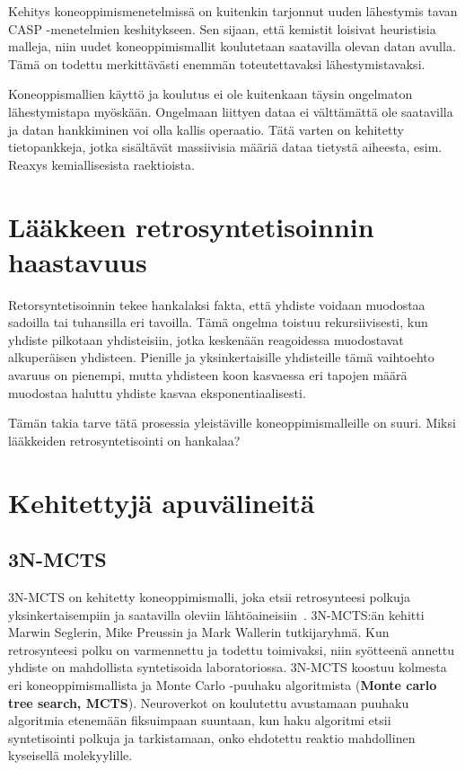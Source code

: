 \documentclass[finnish,twoside,censored,subject,sw-line]{HYthesisML}
\begin{document}
Kehitys koneoppimismenetelmissä on kuitenkin tarjonnut uuden lähestymis tavan CASP -menetelmien keshitykseen. Sen sijaan, että
kemistit loisivat heuristisia malleja, niin uudet koneoppimismallit koulutetaan saatavilla olevan datan avulla.
Tämä on todettu merkittävästi enemmän toteutettavaksi lähestymistavaksi.

Koneoppismallien käyttö ja koulutus ei ole kuitenkaan täysin ongelmaton lähestymistapa myöskään.
Ongelmaan liittyen dataa ei välttämättä ole saatavilla ja datan hankkiminen voi olla kallis operaatio.
Tätä varten on kehitetty tietopankkeja, jotka sisältävät massiivisia määriä dataa tietystä aiheesta, esim. Reaxys kemiallisesista raektioista.


\section{Lääkkeen retrosyntetisoinnin haastavuus}

Retorsyntetisoinnin tekee hankalaksi fakta, että yhdiste voidaan muodostaa sadoilla tai tuhansilla eri tavoilla.
Tämä ongelma toistuu rekursiivisesti, kun yhdiste pilkotaan yhdisteisiin, jotka keskenään reagoidessa muodostavat alkuperäisen yhdisteen.
Pienille ja yksinkertaisille yhdisteille tämä vaihtoehto avaruus on pienempi, mutta yhdisteen koon kasvaessa eri tapojen määrä muodostaa haluttu yhdiste kasvaa eksponentiaalisesti.

Tämän takia tarve tätä prosessia yleistäville koneoppimismalleille on suuri.
Miksi lääkkeiden retrosyntetisointi on hankalaa?~\cite{ButlerKeithT2018Mlfm,deAlmeidaA.Filipa2019Socd}

\section{Kehitettyjä apuvälineitä}

\subsection{3N-MCTS}

3N-MCTS on kehitetty koneoppimismalli, joka etsii retrosynteesi polkuja yksinkertaisempiin
ja saatavilla oleviin lähtöaineisiin~\cite{SeglerMarwinHS2018Pcsw}. 3N-MCTS:än kehitti Marwin Seglerin, Mike Preussin ja Mark Wallerin tutkijaryhmä. Kun retrosynteesi polku on varmennettu ja
todettu toimivaksi, niin syötteenä annettu yhdiste on mahdollista syntetisoida laboratoriossa.
3N-MCTS koostuu kolmesta eri koneoppimismallista ja Monte Carlo -puuhaku algoritmista
(\textbf{Monte carlo tree search, MCTS}). Neuroverkot on koulutettu avustamaan puuhaku algoritmia etenemään
fiksuimpaan suuntaan, kun haku algoritmi etsii syntetisointi polkuja ja tarkistamaan, onko ehdotettu reaktio
mahdollinen kyseisellä molekyylille.
\end{document}
